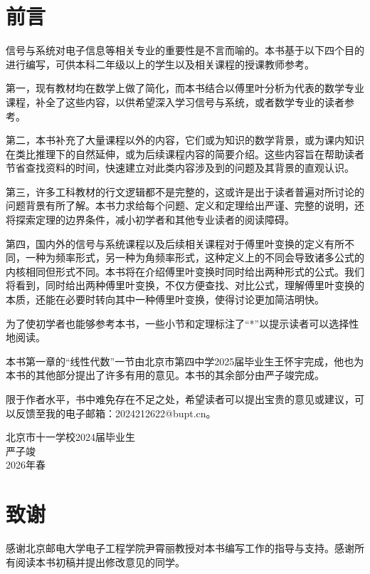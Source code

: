 \section*{前言}

信号与系统对电子信息等相关专业的重要性是不言而喻的。本书基于以下四个目的进行编写，可供本科二年级以上的学生以及相关课程的授课教师参考。

第一，现有教材均在数学上做了简化，而本书结合以傅里叶分析为代表的数学专业课程，补全了这些内容，以供希望深入学习信号与系统，或者数学专业的读者参考。

第二，本书补充了大量课程以外的内容，它们或为知识的数学背景，或为课内知识在类比推理下的自然延伸，或为后续课程内容的简要介绍。这些内容旨在帮助读者节省查找资料的时间，快速建立对此类内容涉及到的问题及其背景的直观认识。

第三，许多工科教材的行文逻辑都不是完整的，这或许是出于读者普遍对所讨论的问题背景有所了解。本书力求给每个问题、定义和定理给出严谨、完整的说明，还将探索定理的边界条件，减小初学者和其他专业读者的阅读障碍。

第四，国内外的信号与系统课程以及后续相关课程对于傅里叶变换的定义有所不同，一种为频率形式，另一种为角频率形式，这种定义上的不同会导致诸多公式的内核相同但形式不同。本书将在介绍傅里叶变换时同时给出两种形式的公式。我们将看到，同时给出两种傅里叶变换，不仅方便查找、对比公式，理解傅里叶变换的本质，还能在必要时转向其中一种傅里叶变换，使得讨论更加简洁明快。

为了使初学者也能够参考本书，一些小节和定理标注了“*”以提示读者可以选择性地阅读。

本书第一章的“线性代数”一节由北京市第四中学2025届毕业生王怀宇完成，他也为本书的其他部分提出了许多有用的意见。本书的其余部分由严子竣完成。

限于作者水平，书中难免存在不足之处，希望读者可以提出宝贵的意见或建议，可以反馈至我的电子邮箱：2024212622@bupt.cn。

{
\raggedleft{}
北京市十一学校2024届毕业生\\
严子竣\\
2026年春\\
}

\section*{致谢}

感谢北京邮电大学电子工程学院尹霄丽教授对本书编写工作的指导与支持。感谢所有阅读本书初稿并提出修改意见的同学。
